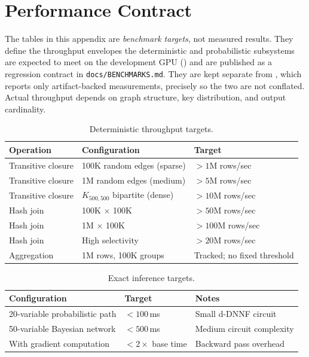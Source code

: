 \section{Performance Contract}\label{app:contract}

The tables in this appendix are \emph{benchmark targets}, not measured results. They define the throughput envelopes the deterministic and probabilistic subsystems are expected to meet on the development GPU () and are published as a regression contract in \texttt{docs/BENCHMARKS.md}. They are kept separate from , which reports only artifact-backed measurements, precisely so the two are not conflated. Actual throughput depends on graph structure, key distribution, and output cardinality.

\begin{table}[htbp]
  \centering
  \caption{Deterministic throughput targets.}
  \label{tab:throughput}
  \small
  \begin{tabular}{@{}lll@{}}
    \toprule
    \textbf{Operation} & \textbf{Configuration} & \textbf{Target} \\
    \midrule
    Transitive closure & 100K random edges (sparse)       & ${>}1$M rows/sec \\
    Transitive closure & 1M random edges (medium)         & ${>}5$M rows/sec \\
    Transitive closure & $K_{500,500}$ bipartite (dense)  & ${>}10$M rows/sec \\
    Hash join          & 100K $\times$ 100K               & ${>}50$M rows/sec \\
    Hash join          & 1M $\times$ 100K                 & ${>}100$M rows/sec \\
    Hash join          & High selectivity                 & ${>}20$M rows/sec \\
    Aggregation        & 1M rows, 100K groups             & Tracked; no fixed threshold \\
    \bottomrule
  \end{tabular}
\end{table}

\begin{table}[htbp]
  \centering
  \caption{Exact inference targets.}
  \label{tab:exact-targets}
  \small
  \begin{tabular}{@{}lll@{}}
    \toprule
    \textbf{Configuration} & \textbf{Target} & \textbf{Notes} \\
    \midrule
    20-variable probabilistic path & ${<}100$\,ms & Small d-DNNF circuit \\
    50-variable Bayesian network   & ${<}500$\,ms & Medium circuit complexity \\
    With gradient computation      & ${<}2\times$ base time & Backward pass overhead \\
    \bottomrule
  \end{tabular}
\end{table}

